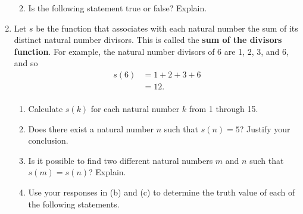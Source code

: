 \begin{previewactivity}
\begin{enumerate}
\begin{enumerate}

\item Is the following statement true or false?  Explain.

\end{enumerate}
  
\item Let  $s$  \label{sym:sumdivisors} be the function that associates with each natural number the sum of its distinct natural number divisors.  This is called the \textbf{sum of the divisors function}.  
%
For example, the natural number divisors of 6 are 1, 2, 3, and 6, and so
\[
\begin{aligned}
  s( 6 ) &= 1 + 2 + 3 + 6 \\ 
                    &= 12. \\ 
\end{aligned} 
\]
\begin{enumerate}
\item Calculate  $s( k )$ for each natural number  $k$  from  1  through 15.



\item Does there exist a natural number  $n$  such that  $s( n ) = 5$?  Justify your conclusion.

\item Is it possible to find two different natural numbers  $m$  and  $n$  such that  \linebreak
$s( m ) = s( n )$?  Explain.

\item Use your responses in (b) and (c) to determine the truth value of each of the following statements.


\end{enumerate}
\end{enumerate}
\end{previewactivity}
